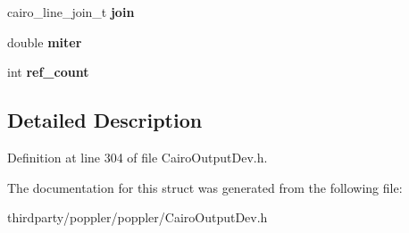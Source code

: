 \begin{DoxyCompactItemize}
\item 
\mbox{\label{struct_cairo_output_dev_1_1_stroke_path_clip_abcb000497f71bf48b377b5e3209004fa}} 
cairo\+\_\+line\+\_\+join\+\_\+t {\bfseries join}
\item 
\mbox{\label{struct_cairo_output_dev_1_1_stroke_path_clip_ae3f2acdff405bb13c4eb4c1d4173df88}} 
double {\bfseries miter}
\item 
\mbox{\label{struct_cairo_output_dev_1_1_stroke_path_clip_ac6d084cfc3f70768b7940c267867d56b}} 
int {\bfseries ref\+\_\+count}
\end{DoxyCompactItemize}


\subsection{Detailed Description}


Definition at line 304 of file Cairo\+Output\+Dev.\+h.



The documentation for this struct was generated from the following file\+:\begin{DoxyCompactItemize}
\item 
thirdparty/poppler/poppler/Cairo\+Output\+Dev.\+h\end{DoxyCompactItemize}
